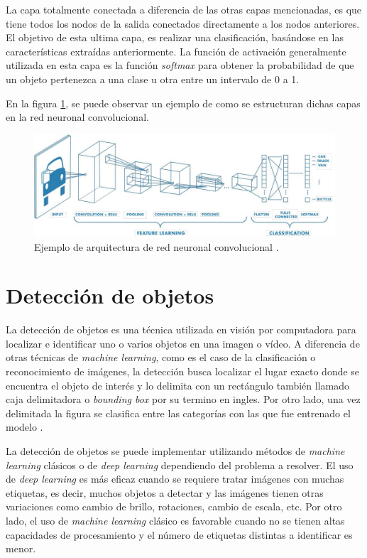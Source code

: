 La capa totalmente conectada a diferencia de las otras capas mencionadas, es que tiene todos los nodos de la salida conectados directamente a los nodos anteriores. El objetivo de esta ultima capa, es realizar una clasificación, basándose en las características extraídas anteriormente. La función de activación generalmente utilizada en esta capa es la función \textit{softmax} para obtener la probabilidad de que un objeto pertenezca a una clase u otra entre un intervalo de 0 a 1.

En la figura \ref{fig:cnn}, se puede observar un ejemplo de como se estructuran dichas capas en la red neuronal convolucional.


\begin{figure}[ht]
	\centering
	\includegraphics[scale=.45]{./Figures/cnn-image.jpeg}
	\caption{Ejemplo de arquitectura de red neuronal convolucional \cite{WEBSITE:2}.}
	\label{fig:cnn}
\end{figure}


\section{Detección de objetos}

La detección de objetos es una técnica utilizada en visión por computadora para localizar e identificar uno o varios objetos en una imagen o vídeo. A diferencia de otras técnicas de \textit{machine learning}, como es el caso de la clasificación o reconocimiento de imágenes, la detección busca localizar el lugar exacto donde se encuentra el objeto de interés y lo delimita con un rectángulo también llamado caja delimitadora o \textit{bounding box} por su termino en ingles. Por otro lado, una vez delimitada la figura se clasifica entre las categorías con las que fue entrenado el modelo \cite{WEBSITE:5}.

La detección de objetos se puede implementar utilizando métodos de \textit{machine learning} clásicos o de \textit{deep learning} dependiendo del problema a resolver\cite{WEBSITE:6}. El uso de \textit{deep learning} es más eficaz cuando se requiere tratar imágenes con muchas etiquetas, es decir, muchos objetos a detectar y las imágenes tienen otras variaciones como cambio de brillo, rotaciones, cambio de escala, etc. Por otro lado, el uso de \textit{machine learning} clásico es favorable cuando no se tienen altas capacidades de procesamiento y el número de etiquetas distintas a identificar es menor.

